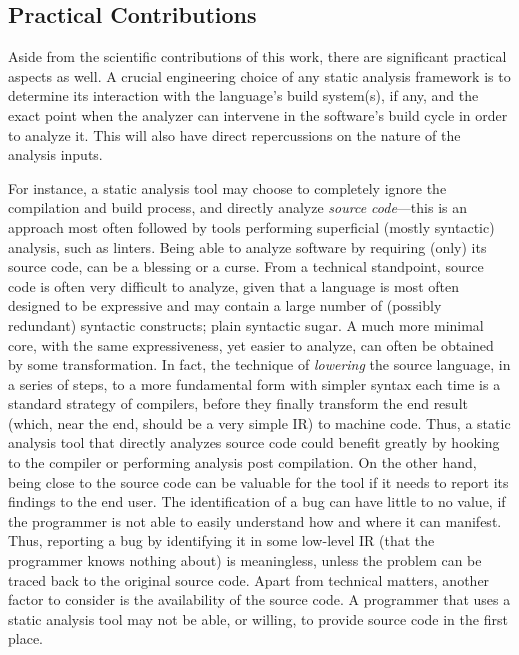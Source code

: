 \subsection{Practical Contributions}

Aside from the scientific contributions of this work, there are
significant practical aspects as well. A crucial engineering choice of
any static analysis framework is to determine its interaction with the
language's build system(s), if any, and the exact point when the
analyzer can intervene in the software's build cycle in order to
analyze it. This will also have direct repercussions on the nature of
the analysis inputs.

For instance, a static analysis tool may choose to completely ignore
the compilation and build process, and directly analyze \emph{source
  code}---this is an approach most often followed by tools performing
superficial (mostly syntactic) analysis, such as linters. Being able
to analyze software by requiring (only) its source code, can be a
blessing or a curse. From a technical standpoint, source code is often
very difficult to analyze, given that a language is most often
designed to be expressive and may contain a large number of (possibly
redundant) syntactic constructs; plain syntactic sugar. A much more
minimal core, with the same expressiveness, yet easier to analyze, can
often be obtained by some transformation. In fact, the technique of
\emph{lowering} the source language, in a series of steps, to a more
fundamental form with simpler syntax each time is a standard strategy
of compilers, before they finally transform the end result (which,
near the end, should be a very simple IR) to machine code. Thus, a
static analysis tool that directly analyzes source code could benefit
greatly by hooking to the compiler or performing analysis post
compilation.
%
On the other hand, being close to the source code can be valuable for
the tool if it needs to report its findings to the end user. The
identification of a bug can have little to no value, if the programmer
is not able to easily understand how and where it can manifest. Thus,
reporting a bug by identifying it in some low-level IR (that the
programmer knows nothing about) is meaningless, unless the problem can
be traced back to the original source code.
%
Apart from technical matters, another factor to consider is the
availability of the source code. A programmer that uses a static
analysis tool may not be able, or willing, to provide source code
in the first place.

